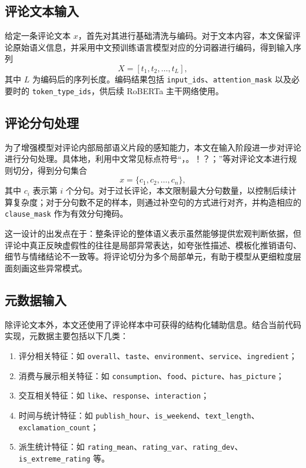 \documentclass[UTF8,oneside,openright,fontset=none]{ctexbook}
\numberwithin{equation}{chapter}
\begin{document}
\subsection{评论文本输入}

给定一条评论文本 $x$，首先对其进行基础清洗与编码。对于文本内容，本文保留评论原始语义信息，并采用中文预训练语言模型对应的分词器进行编码，得到输入序列
\begin{equation}
  X = [t_1,t_2,\ldots,t_L],
\end{equation}
其中 $L$ 为编码后的序列长度。编码结果包括 \texttt{input\_ids}、\texttt{attention\_mask} 以及必要时的 \texttt{token\_type\_ids}，供后续 RoBERTa 主干网络使用。

\subsection{评论分句处理}

为了增强模型对评论内部局部语义片段的感知能力，本文在输入阶段进一步对评论进行分句处理。具体地，利用中文常见标点符号“，。！？；”等对评论文本进行规则切分，得到分句集合
\begin{equation}
  x=\{c_1,c_2,\ldots,c_n\},
\end{equation}
其中 $c_i$ 表示第 $i$ 个分句。对于过长评论，本文限制最大分句数量，以控制后续计算复杂度；对于分句数不足的样本，则通过补空句的方式进行对齐，并构造相应的 \texttt{clause\_mask} 作为有效分句掩码。

这一设计的出发点在于：整条评论的整体语义表示虽然能够提供宏观判断依据，但评论中真正反映虚假性的往往是局部异常表达，如夸张性描述、模板化推销语句、细节与情绪结论不一致等。将评论切分为多个局部单元，有助于模型从更细粒度层面刻画这些异常模式。

\subsection{元数据输入}

除评论文本外，本文还使用了评论样本中可获得的结构化辅助信息。结合当前代码实现，元数据主要包括以下几类：

\begin{enumerate}
  \item 评分相关特征：如 \texttt{overall}、\texttt{taste}、\texttt{environment}、\texttt{service}、\texttt{ingredient}；
  \item 消费与展示相关特征：如 \texttt{consumption}、\texttt{food}、\texttt{picture}、\texttt{has\_picture}；
  \item 交互相关特征：如 \texttt{like}、\texttt{response}、\texttt{interaction}；
  \item 时间与统计特征：如 \texttt{publish\_hour}、\texttt{is\_weekend}、\texttt{text\_length}、\texttt{exclamation\_count}；
  \item 派生统计特征：如 \texttt{rating\_mean}、\texttt{rating\_var}、\texttt{rating\_dev}、\texttt{is\_extreme\_rating} 等。
\end{enumerate}
\end{document}
